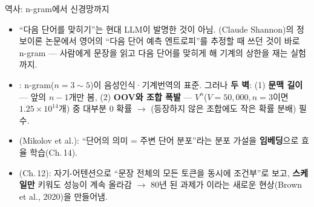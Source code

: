 \documentclass[aspectratio=169,11pt]{beamer}
\begin{document}

\begin{frame}{역사: n-gram에서 신경망까지}
  \begin{itemize}
    \item ``다음 단어를 맞히기''는 현대 LLM이 발명한 것이
      아님. (Claude Shannon)의 정보이론
      논문에서 영어의 ``다음 단어 예측 엔트로피''를 추정할
      때 쓰던 것이 바로 n-gram — 사람에게 문장을 읽고 다음
      단어를 맞히게 해 기계의 상한을 재는 실험까지.
    \item {}: n-gram($n=3\sim5$)이
      음성인식·기계번역의 표준. 그러나 \textbf{두 벽}:
      (1) \textbf{문맥 길이} — 앞의 $n-1$개만 봄,
      (2) \textbf{OOV와 조합 폭발} — $V^n$($V=50{,}000, n=3$이면
      $1.25 \times 10^{14}$개) 중 대부분 0 확률 $\to$
      (등장하지 않은 조합에도 작은 확률 분배)
      필수.
    \item {}(Mikolov et al.): ``단어의 의미 =
      주변 단어 분포''라는 분포 가설을 \textbf{임베딩}으로
      효율 학습(Ch.\,14).
    \item {}(Ch.\,12): 자기-어텐션으로
      ``문장 전체의 모든 토큰을 동시에 조건부''로 보고,
      \textbf{스케일만} 키워도 성능이 계속 올라감 $\to$ 80년
      된 과제가 이라는 새로운 현상(Brown et al.,
      2020)을 만들어냄.
  \end{itemize}
\end{frame}
\end{document}
